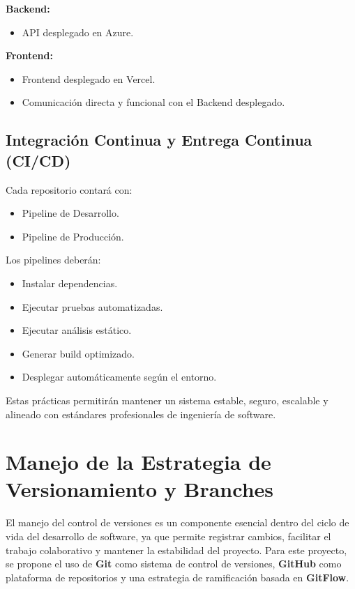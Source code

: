 \documentclass[12pt]{article}
\begin{document}
\textbf{Backend:}
\begin{itemize}
    \item API desplegado en Azure.
\end{itemize}

\textbf{Frontend:}
\begin{itemize}
    \item Frontend desplegado en Vercel.
    \item Comunicación directa y funcional con el Backend desplegado.
\end{itemize}

\subsection{Integración Continua y Entrega Continua (CI/CD)}

Cada repositorio contará con:

\begin{itemize}
    \item Pipeline de Desarrollo.
    \item Pipeline de Producción.
\end{itemize}

Los pipelines deberán:

\begin{itemize}
    \item Instalar dependencias.
    \item Ejecutar pruebas automatizadas.
    \item Ejecutar análisis estático.
    \item Generar build optimizado.
    \item Desplegar automáticamente según el entorno.
\end{itemize}

Estas prácticas permitirán mantener un sistema estable, seguro, escalable y alineado con estándares profesionales de ingeniería de software.


\section{Manejo de la Estrategia de Versionamiento y Branches}

El manejo del control de versiones es un componente esencial dentro del ciclo de vida del desarrollo de software, ya que permite registrar cambios, facilitar el trabajo colaborativo y mantener la estabilidad del proyecto. Para este proyecto, se propone el uso de \textbf{Git} como sistema de control de versiones, \textbf{GitHub} como plataforma de repositorios y una estrategia de ramificación basada en \textbf{GitFlow}.
\end{document}
